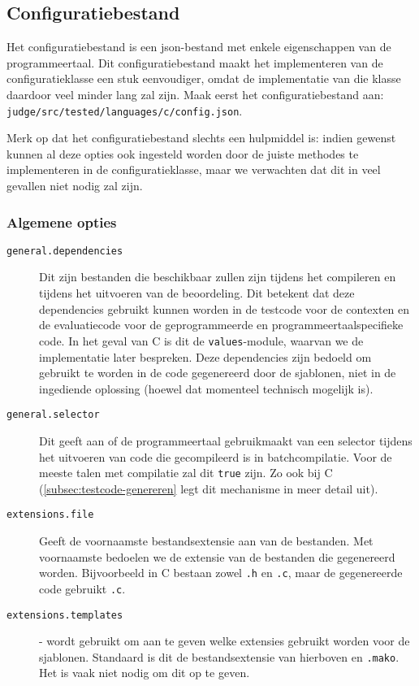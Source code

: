 \inputminted{text}{code/dirs-c-code-location.txt}

\subsection{Configuratiebestand}\label{subsec:configuratiebestand}

Het configuratiebestand is een json-bestand met enkele eigenschappen van de programmeertaal.
Dit configuratiebestand maakt het implementeren van de configuratieklasse een stuk eenvoudiger, omdat de implementatie van die klasse daardoor veel minder lang zal zijn.
Maak eerst het configuratiebestand aan: \texttt{judge/src/tested/languages/c/config.json}.

Merk op dat het configuratiebestand slechts een hulpmiddel is: indien gewenst kunnen al deze opties ook ingesteld worden door de juiste methodes te implementeren in de configuratieklasse, maar we verwachten dat dit in veel gevallen niet nodig zal zijn.

\subsubsection{Algemene opties}

\begin{description}
    \item[\texttt{general.dependencies}] Dit zijn bestanden die beschikbaar zullen zijn tijdens het compileren en tijdens het uitvoeren van de beoordeling.
    Dit betekent dat deze dependencies gebruikt kunnen worden in de testcode voor de contexten en de evaluatiecode voor de geprogrammeerde en programmeertaalspecifieke code.
    In het geval van C is dit de \texttt{values}-module, waarvan we de implementatie later bespreken.
    Deze dependencies zijn bedoeld om gebruikt te worden in de code gegenereerd door de sjablonen, niet in de ingediende oplossing (hoewel dat momenteel technisch mogelijk is).
    \item[\texttt{general.selector}] Dit geeft aan of de programmeertaal gebruikmaakt van een selector tijdens het uitvoeren van code die gecompileerd is in batchcompilatie.
    Voor de meeste talen met compilatie zal dit \texttt{true} zijn.
    Zo ook bij C (\cref{subsec:testcode-genereren} legt dit mechanisme in meer detail uit).
    \item[\texttt{extensions.file}] Geeft de voornaamste bestandsextensie aan van de bestanden.
    Met voornaamste bedoelen we de extensie van de bestanden die gegenereerd worden.
    Bijvoorbeeld in C bestaan zowel \texttt{.h} en \texttt{.c}, maar de gegenereerde code gebruikt \texttt{.c}.
    \item[\texttt{extensions.templates}] - wordt gebruikt om aan te geven welke extensies gebruikt worden voor de sjablonen.
    Standaard is dit de bestandsextensie van hierboven en \texttt{.mako}.
    Het is vaak niet nodig om dit op te geven.
\end{description}

